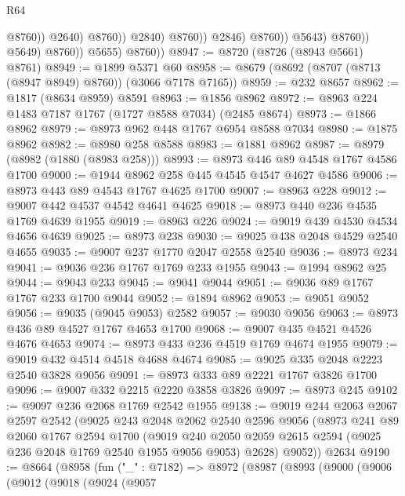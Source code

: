 \begin{lexlean}{R64}
\begin{coremodule}
                                            @8760))
                                        @2640)
                                      @8760))
                                  @2840)
                                @8760))
                            @2846)
                          @8760))
                      @5643)
                    @8760))
                @5649)
              @8760))
          @5655)
        @8760))
@8947 := @8720 (@8726 (@8943 @5661) @8761)
@8949 := @1899 @5371 @60
@8958 := @8679 (@8692 (@8707 (@8713 (@8947 @8949) @8760)) (@3066 @7178 @7165))
@8959 := @232 @8657
@8962 := @1817 (@8634 @8959) @8591
@8963 := @1856 @8962
@8972 := @8963 @224 @1483 @7187 @1767 (@1727 @8588 @7034) (@2485 @8674)
@8973 := @1866 @8962
@8979 := @8973 @962 @448 @1767 @6954 @8588 @7034
@8980 := @1875 @8962
@8982 := @8980 @258 @8588
@8983 := @1881 @8962
@8987 := @8979 (@8982 (@1880 (@8983 @258)))
@8993 := @8973 @446 @89 @4548 @1767 @4586 @1700
@9000 := @1944 @8962 @258 @445 @4545 @4547 @4627 @4586
@9006 := @8973 @443 @89 @4543 @1767 @4625 @1700
@9007 := @8963 @228
@9012 := @9007 @442 @4537 @4542 @4641 @4625
@9018 := @8973 @440 @236 @4535 @1769 @4639 @1955
@9019 := @8963 @226
@9024 := @9019 @439 @4530 @4534 @4656 @4639
@9025 := @8973 @238
@9030 := @9025 @438 @2048 @4529 @2540 @4655
@9035 := @9007 @237 @1770 @2047 @2558 @2540
@9036 := @8973 @234
@9041 := @9036 @236 @1767 @1769 @233 @1955
@9043 := @1994 @8962 @25
@9044 := @9043 @233
@9045 := @9041 @9044
@9051 := @9036 @89 @1767 @1767 @233 @1700 @9044
@9052 := @1894 @8962
@9053 := @9051 @9052
@9056 := @9035 (@9045 @9053) @2582
@9057 := @9030 @9056
@9063 := @8973 @436 @89 @4527 @1767 @4653 @1700
@9068 := @9007 @435 @4521 @4526 @4676 @4653
@9074 := @8973 @433 @236 @4519 @1769 @4674 @1955
@9079 := @9019 @432 @4514 @4518 @4688 @4674
@9085 := @9025 @335 @2048 @2223 @2540 @3828 @9056
@9091 := @8973 @333 @89 @2221 @1767 @3826 @1700
@9096 := @9007 @332 @2215 @2220 @3858 @3826
@9097 := @8973 @245
@9102 := @9097 @236 @2068 @1769 @2542 @1955
@9138 := @9019
    @244
    @2063
    @2067
    @2597
    @2542
    (@9025
      @243
      @2048
      @2062
      @2540
      @2596
      @9056
      (@8973
        @241
        @89
        @2060
        @1767
        @2594
        @1700
        (@9019 @240 @2050 @2059 @2615 @2594 (@9025 @236 @2048 @1769 @2540 @1955 @9056 @9053) @2628)
        @9052))
    @2634
@9190 := @8664
    (@8958
      (fun ("_" : @7182) =>
      @8972
        (@8987
          (@8993
            (@9000
              (@9006
                (@9012
                  (@9018
                    (@9024
                      (@9057

\end{coremodule}
\end{lexlean}
